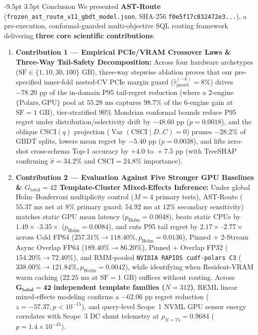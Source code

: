 \documentclass[10pt,a4paper]{article}
\makeatletter
\renewcommand\section{\@startsection{section}{1}{\z@}%
  {-9.5pt \@plus -2pt \@minus -1.5pt}%
  {3.5pt \@plus 1pt}%
  {\normalfont\large\bfseries}}
\makeatother
\begin{document}
\section{Conclusion}
\enlargethispage{1.5\baselineskip}
\vspace{-3pt}
We presented \textbf{AST-Route} (\texttt{frozen\_ast\_route\_v11\_gbdt\_model.json}, SHA-256 \texttt{f0e5f17c832472e3...}), a pre-execution, conformal-guarded multi-objective SQL routing framework delivering \textbf{three core scientific contributions}:
\begin{enumerate}[leftmargin=1.5em,itemsep=1.5pt]
    \item \textbf{Contribution 1 --- Empirical PCIe/VRAM Crossover Laws \& Three-Way Tail-Safety Decomposition:} Across four hardware archetypes ($\text{SF}\in\{1,10,30,100\}\text{ GB}$), three-way stepwise ablation proves that our pre-specified inner-fold nested-CV PCIe margin guard ($\hat{\tau}_{\text{guard}}^{(-k)}=8\%$) drives $-78.20\text{ pp}$ of the in-domain P95 tail-regret reduction (where a 2-engine $\{\text{Polars},\text{GPU}\}$ pool at $55.28\text{ ms}$ captures $98.7\%$ of the 6-engine gain at $\text{SF}=1\text{ GB}$), tier-stratified $90\%$ Mondrian conformal bounds reduce P95 regret under distribution/selectivity drift by $-48.60\text{ pp}$ ($p=0.0018$), and the oblique $\text{CSCI}(q)$ projection ($\operatorname{Var}(\text{CSCI}\mid D..C)=0$) prunes $-28.2\%$ of GBDT splits, lowers mean regret by $-5.40\text{ pp}$ ($p=0.0038$), and lifts zero-shot cross-schema Top-1 accuracy by $+4.0\text{ to }+7.5\text{ pp}$ (with TreeSHAP confirming $\hat{\sigma}=34.2\%$ and $\text{CSCI}=24.8\%$ importance).
    \item \textbf{Contribution 2 --- Evaluation Against Five Stronger GPU Baselines \& $G_{\text{total}}=42$ Template-Cluster Mixed-Effects Inference:} Under global Holm--Bonferroni multiplicity control ($M=4$ primary tests), AST-Route ($55.37\text{ ms}$ net at $8\%$ primary guard; $54.92\text{ ms}$ at $12\%$ secondary sensitivity) matches static GPU mean latency ($p_{\text{Holm}}=0.0048$), beats static CPUs by $1.49\times\text{--}3.35\times$ ($p_{\text{Holm}}=0.0084$), and cuts P95 tail regret by $2.17\times\text{--}2.77\times$ across Cold FP64 ($257.31\%\rightarrow 118.40\%, p_{\text{Holm}}=0.0136$), Pinned + 2-Stream Async Overlap FP64 ($189.40\%\rightarrow 86.20\%$), Pinned + Overlap FP32 ($154.20\%\rightarrow 72.40\%$), and RMM-pooled \texttt{NVIDIA RAPIDS cudf-polars C3} ($338.00\%\rightarrow 121.84\%, p_{\text{Webb}}=0.0042$), while identifying when Resident-VRAM warm caching ($22.25\text{ ms}$ at $\text{SF}=1\text{ GB}$) suffices without routing. Across $\mathbf{G_{\text{total}}=42}$ \textbf{independent template families ($N=312$)}, REML linear mixed-effects modeling confirms a $-62.06\text{ pp}$ regret reduction ($z=-57.37, p<10^{-15}$), and query-level Scope~1 NVML GPU sensor energy correlates with Scope~3 DC shunt telemetry at $\rho_{N=75}=0.9684$ ($p=1.4\times 10^{-45}$).

\end{enumerate}
\end{document}
